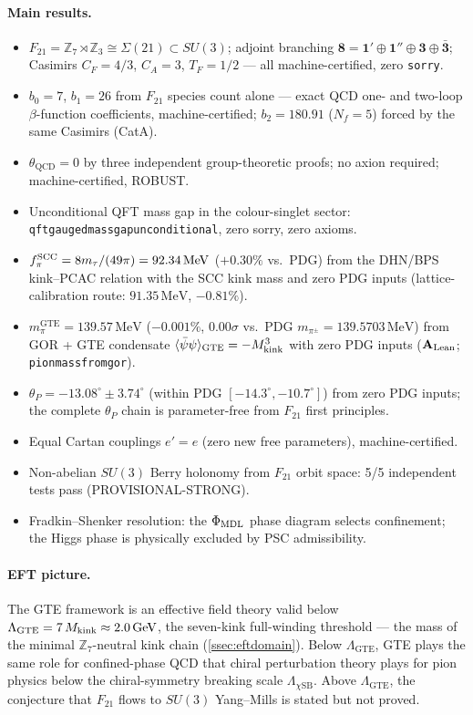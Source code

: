 \documentclass[11pt]{article}
\theoremstyle{remark}
\newcommand{\GTE}{\text{GTE}}
\newcommand{\QCD}{\text{QCD}}
\newcommand{\ZS}{\mathbb{Z}_7}
\newcommand{\ZZ}{\mathbb{Z}}
\newcommand{\phimdl}{\Phi_{\rm MDL}}
\newcommand{\Ftwentyone}{F_{21}}
\newcommand{\lean}[1]{%
  \penalty-100
  \begingroup\def\_{\textunderscore\allowbreak}\texttt{#1}\endgroup}
\newcommand{\CatAL}{\ensuremath{\textbf{A}_{\rm Lean}}}
\begin{document}
\paragraph{Main results.}
\begin{itemize}[leftmargin=2em]
\item $\Ftwentyone = \ZS \rtimes \ZZ_3 \cong \Sigma(21) \subset SU(3)$;
  adjoint branching $\mathbf{8} = \mathbf{1}' \oplus \mathbf{1}''
  \oplus \mathbf{3} \oplus \bar{\mathbf{3}}$;
  Casimirs $C_F = 4/3$, $C_A = 3$, $T_F = 1/2$ --- all machine-certified,
  zero \texttt{sorry}.
\item $b_0 = 7$, $b_1 = 26$ from $\Ftwentyone$ species count alone
  --- exact QCD one- and two-loop $\beta$-function coefficients,
  machine-certified; $b_2 = 180.91$ ($N_f = 5$) forced by the same Casimirs
  (CatA).
\item $\theta_{\QCD} = 0$ by three independent group-theoretic proofs;
  no axion required; machine-certified, ROBUST.
\item Unconditional QFT mass gap in the colour-singlet sector:
  \lean{qft\_gauged\_mass\_gap\_unconditional}, zero sorry, zero axioms.
\item $f_\pi^{\rm SCC} = 8 m_\tau/(49\pi) = 92.34\,\mathrm{MeV}$ ($+0.30\%$
  vs.\ PDG) from the DHN/BPS kink--PCAC relation with the SCC kink mass and
  zero PDG inputs (lattice-calibration route: $91.35\,\mathrm{MeV}$,
  $-0.81\%$).
\item $m_\pi^{\GTE} = 139.57\,\mathrm{MeV}$ ($-0.001\%$, $0.00\sigma$ vs.\ PDG $m_{\pi^\pm} = 139.5703\,\mathrm{MeV}$) from GOR + GTE condensate $\langle\bar\psi\psi\rangle_{\rm GTE} = -M_{\rm kink}^3$ with zero PDG inputs ($\CatAL$; \lean{pion\_mass\_from\_gor}).
\item $\theta_P = -13.08^\circ \pm 3.74^\circ$ (within PDG
  $[-14.3^\circ, -10.7^\circ]$) from zero PDG inputs; the complete
  $\theta_P$ chain is parameter-free from $\Ftwentyone$ first principles.
\item Equal Cartan couplings $e' = e$ (zero new free parameters),
  machine-certified.
\item Non-abelian $SU(3)$ Berry holonomy from $\Ftwentyone$ orbit space:
  5/5 independent tests pass (PROVISIONAL-STRONG).
\item Fradkin--Shenker resolution: the $\phimdl$ phase diagram selects
  confinement; the Higgs phase is physically excluded by PSC admissibility.
\end{itemize}

\paragraph{EFT picture.}
The GTE framework is an effective field theory valid below
$\Lambda_{\GTE} = 7\,M_{\rm kink} \approx 2.0\,\mathrm{GeV}$, the seven-kink
full-winding threshold --- the mass of the minimal $\ZS$-neutral kink chain
(\cref{ssec:eftdomain}).
Below $\Lambda_{\GTE}$, GTE plays the same role for confined-phase QCD that
chiral perturbation theory plays for pion physics below the chiral-symmetry
breaking scale $\Lambda_{\chi\mathrm{SB}}$.
Above $\Lambda_{\GTE}$, the conjecture that $\Ftwentyone$ flows to $SU(3)$
Yang--Mills is stated but not proved.
\end{document}
